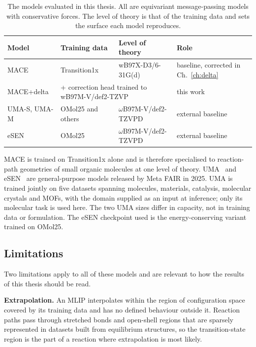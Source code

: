 \begin{table}[h]
\centering
\caption{The models evaluated in this thesis. All are equivariant message-passing
models with conservative forces. The level of theory is that of the training data and
sets the surface each model reproduces.}
\label{tab:mlip-models}
\begin{tabular}{llll}
\hline
Model & Training data & Level of theory & Role \\
\hline
MACE & Transition1x & \mbox{wB97X-D3/6-31G(d)} & baseline, corrected in Ch.~\ref{ch:delta} \\
MACE+delta & \multicolumn{2}{l}{\quad + correction head trained to \mbox{wB97M-V/def2-TZVP}} & this work \\
UMA-S, UMA-M & OMol25 and others & \mbox{$\omega$B97M-V/def2-TZVPD} & external baseline \\
eSEN & OMol25 & \mbox{$\omega$B97M-V/def2-TZVPD} & external baseline \\
\hline
\end{tabular}
\end{table}
 
MACE is trained on Transition1x alone and is therefore specialised to reaction-path
geometries of small organic molecules at one level of theory. UMA~\cite{uma} and
eSEN~\cite{esen} are general-purpose models released by Meta FAIR in 2025. UMA is
trained jointly on five datasets spanning molecules, materials, catalysis, molecular
crystals and MOFs, with the domain supplied as an input at inference; only its molecular
task is used here. The two UMA sizes differ in capacity, not in training data or
formulation. The eSEN checkpoint used is the energy-conserving variant trained on OMol25.
 
\subsection{Limitations}
\label{sec:mlip-limits}
 
Two limitations apply to all of these models and are relevant to how the results of this
thesis should be read.
 
\textbf{Extrapolation.} An MLIP interpolates within the region of configuration space
covered by its training data and has no defined behaviour outside it. Reaction paths
pass through stretched bonds and open-shell regions that are sparsely represented in
datasets built from equilibrium structures, so the transition-state region is the part
of a reaction where extrapolation is most likely.
 
